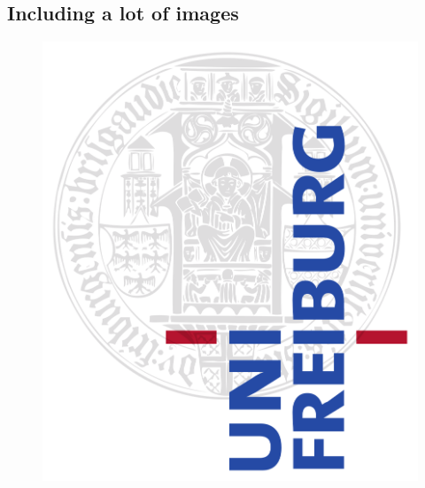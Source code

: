 \subsection[Include images]{Including a lot of images}
\begin{frame}[plain]
	\begin{figure}
		\centering
		\includegraphics[scale=.2]{img/Logo1000px.png}
	\end{figure}
\end{frame}


